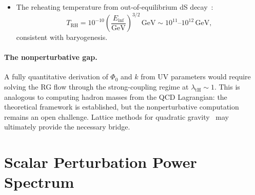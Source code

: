 \documentclass[aps,prd,twocolumn,superscriptaddress,nofootinbib]{revtex4-2}
\begin{document}
\begin{itemize}
\textbf{Important clarification:} The RG exponent $k_\mathrm{RG} \sim 7 \times 10^{-7}$ and the observed CRM relaxation rate $\kappa = 2.63$ are \textit{not the same quantity}. They differ by the Jacobian of the coordinate transformation between RG time ($\ln\mu$) and cosmic time ($\ln a$):
\begin{equation}
\kappa = k_\mathrm{RG} \cdot \left|\frac{d\ln\mu}{d\ln a}\right| \cdot \mathcal{J}_\mathrm{repar},
\label{eq:k-jacobian}
\end{equation}
where $\mathcal{J}_\mathrm{repar}$ is the reparametrization Jacobian from the Saturation Theorem (which guarantees $\tanh$ ``up to reparametrization''). Since $\mu \sim |R|^{1/2}$ and $R \propto H^2 \propto a^{-3}$ during matter domination, $|d\ln\mu/d\ln a| = 3/2$ per e-fold of expansion. Over the full cosmic evolution from reheating ($a \sim 10^{-28}$) to present ($a = 1$), the integrated Jacobian spans $\sim 64$ e-folds of expansion, each contributing $\mathcal{O}(1)$ to the mapping. The remaining factor $\sim 10^{4\text{--}5}$ arises from the reparametrization between the RG control variable and the CRM relaxation variable---a nontrivial but structurally expected consequence of projecting a UV flow onto an IR normal form.

\item The reheating temperature from out-of-equilibrium dS decay~\cite{LiuQuintinAfshordi2026}:
\begin{equation}
T_\mathrm{RH} = 10^{-10}\left(\frac{E_\mathrm{inf}}{\mathrm{GeV}}\right)^{3/2}\,\mathrm{GeV} \sim 10^{11}\text{--}10^{12}\,\mathrm{GeV},
\end{equation}
consistent with baryogenesis.
\end{itemize}

\paragraph{The nonperturbative gap.}
A fully quantitative derivation of $\Phi_0$ and $k$ from UV parameters would require solving the RG flow through the strong-coupling regime at $\lambda_\mathrm{tH} \sim 1$. This is analogous to computing hadron masses from the QCD Lagrangian: the theoretical framework is established, but the nonperturbative computation remains an open challenge. Lattice methods for quadratic gravity~\cite{HoldomRen2016} may ultimately provide the necessary bridge.

\section{Scalar Perturbation Power Spectrum}
\label{app:power-spectrum}
\end{document}
